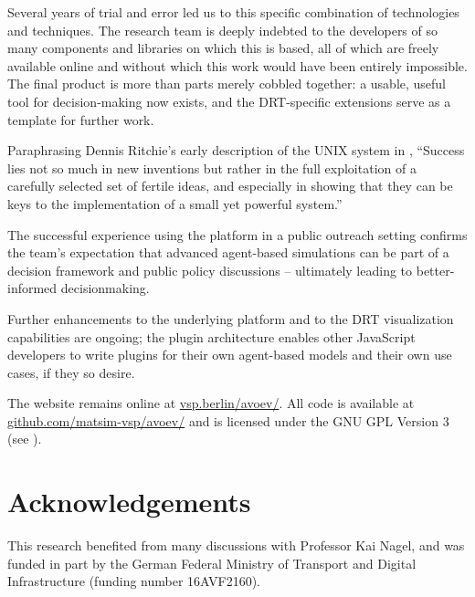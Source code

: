 Several years of trial and error led us to this specific combination of technologies and techniques. The research team is deeply indebted to the developers of so many components and libraries on which this is based, all of which are freely available online and without which this work would have been entirely impossible. The final product is more than parts merely cobbled together: a usable, useful tool for decision-making now exists, and the DRT-specific extensions serve as a template for further work.

Paraphrasing Dennis Ritchie's early description of the UNIX system in \citet{Ritchie1978unix}, ``Success lies not so much in new inventions but rather in the full exploitation of a carefully selected set of fertile ideas, and especially in showing that they can be keys to the implementation of a small yet powerful system.''

The successful experience using the platform in a public outreach setting confirms the team's expectation that advanced agent-based simulations can be part of a decision framework and public policy discussions -- ultimately leading to better-informed decisionmaking.

Further enhancements to the underlying platform and to the DRT visualization capabilities are ongoing; the plugin architecture enables other JavaScript developers to write plugins for their own agent-based models and their own use cases, if they so desire.

The website remains online at \href{https://vsp.berlin/avoev/}{vsp.berlin/avoev/}. All code is available at \href{https://github.com/matsim-vsp/avoev}{github.com/matsim-vsp/avoev/} and is licensed under the GNU GPL Version 3 (see \cite{FSF2007GnuGPL}).

\section{Acknowledgements}

This research benefited from many discussions with Professor Kai Nagel, and was funded in part by the German Federal Ministry of Transport and Digital Infrastructure (funding number 16AVF2160).
